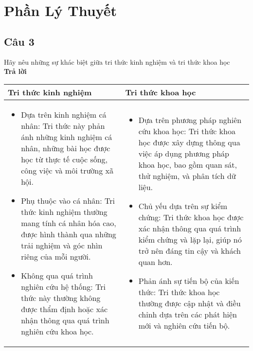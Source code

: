 \section{Phần Lý Thuyết}
\subsection* {Câu 3} Hãy nêu những sự khác biệt giữa tri thức kinh nghiệm và tri
thức khoa học\\
{\bf Trả lời}
\vspace*{0.5cm}

\begin{tabular}{|m{7cm}|m{7cm}|}
    \hline
    \textbf{Tri thức kinh nghiệm} &
    \textbf{Tri thức khoa học} \\
    \hline
    \begin{itemize}
        \item Dựa trên kinh nghiệm cá nhân: Tri thức này phản ánh những kinh nghiệm cá nhân, những bài học được học từ thực tế cuộc sống, công việc và môi trường xã hội.
        \item Phụ thuộc vào cá nhân: Tri thức kinh nghiệm thường mang tính cá nhân hóa cao, được hình thành qua những trải nghiệm và góc nhìn riêng của mỗi người.
        \item Không qua quá trình nghiên cứu hệ thống: Tri thức này thường không được thẩm định hoặc xác nhận thông qua quá trình nghiên cứu khoa học.
    \end{itemize} &
    \begin{itemize}
        \item Dựa trên phương pháp nghiên cứu khoa học: Tri thức khoa học được xây dựng thông qua việc áp dụng phương pháp khoa học, bao gồm quan sát, thử nghiệm, và phân tích dữ liệu.
        \item Chủ yếu dựa trên sự kiểm chứng: Tri thức khoa học được xác nhận thông qua quá trình kiểm chứng và lặp lại, giúp nó trở nên đáng tin cậy và khách quan hơn.
        \item Phản ánh sự tiến bộ của kiến thức: Tri thức khoa học thường được cập nhật và điều chỉnh dựa trên các phát hiện mới và nghiên cứu tiến bộ.
    \end{itemize} \\
    \hline
    \end{tabular}
\vspace*{0.5cm}
